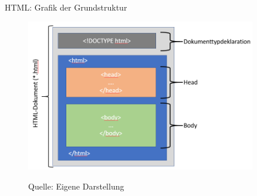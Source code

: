 \documentclass[xcolor=dvipsnames]{beamer}\usepackage[]{graphicx}\usepackage[]{color}
\begin{document}
\begin{frame}{HTML: Grafik der Grundstruktur }
  \begin{figure}
  	\centering
  	\includegraphics[width=0.9\textwidth]{figure/htmlbasicstructure.png}
  	\\
  	{\footnotesize \tiny Quelle: Eigene Darstellung \par}
  \end{figure}
\end{frame}
\end{document}
